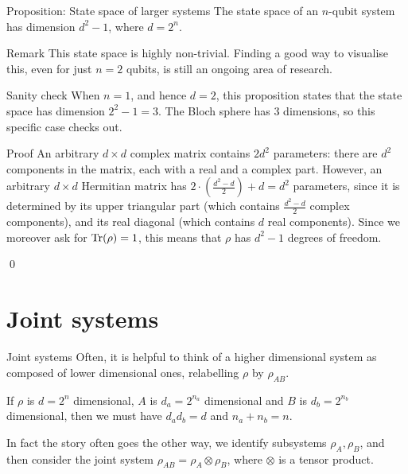 \documentclass[a4paper]{article}
\begin{document}
\begin{parag}{Proposition: State space of larger systems}
    The state space of an $n$-qubit system has dimension $d^2 - 1$, where $d = 2^n$.

    \begin{subparag}{Remark}
        This state space is highly non-trivial. Finding a good way to visualise this, even for just $n = 2$ qubits, is still an ongoing area of research.
    \end{subparag}

    \begin{subparag}{Sanity check}
        When $n = 1$, and hence $d = 2$, this proposition states that the state space has dimension $2^2 - 1 = 3$. The Bloch sphere has 3 dimensions, so this specific case checks out.
    \end{subparag}

    \begin{subparag}{Proof}
        An arbitrary $d \times d$ complex matrix contains $2 d^2$ parameters: there are $d^2$ components in the matrix, each with a real and a complex part. However, an arbitrary $d \times d$ Hermitian matrix has $2\cdot \left(\frac{d^2 - d}{2}\right) + d = d^2$ parameters, since it is determined by its upper triangular part (which contains $\frac{d^2 - d}{2}$ complex components), and its real diagonal (which contains $d$ real components). Since we moreover ask for $\Tr\left(\rho\right) = 1$, this means that $\rho$ has $d^2 - 1$ degrees of freedom. 

        \qed
    \end{subparag}
\end{parag}

\section{Joint systems}

\begin{parag}{Joint systems}
    Often, it is helpful to think of a higher dimensional system as composed of lower dimensional ones, relabelling $\rho$ by $\rho_{AB}$.

    If $\rho$ is $d = 2^n$ dimensional, $A$ is $d_a = 2^{n_a}$ dimensional and $B$ is $d_b = 2^{n_b}$ dimensional, then we must have $d_a d_b = d$ and $n_a + n_b = n$.

    In fact the story often goes the other way, we identify subsystems $\rho_A, \rho_B$, and then consider the joint system $\rho_{AB} = \rho_A \otimes \rho_B$, where $\otimes$ is a tensor product.
\end{parag}
\end{document}
